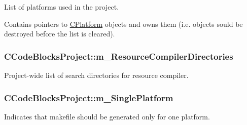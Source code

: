List of platforms used in the project. 

Contains pointers to \hyperlink{classCPlatform}{C\-Platform} objects and owns them (i.\-e. objects sould be destroyed before the list is cleared). \hypertarget{classCCodeBlocksProject_aebc2c851c4ee0779cbeefff19a723b07}{
\subsubsection[{m\-\_\-\-Resource\-Compiler\-Directories}]{\setlength{\rightskip}{0pt plus 5cm}C\-Code\-Blocks\-Project\-::m\-\_\-\-Resource\-Compiler\-Directories\hspace{0.3cm}{\ttfamily [private]}}}\label{classCCodeBlocksProject_aebc2c851c4ee0779cbeefff19a723b07}


Project-\/wide list of search directories for resource compiler. 

\hypertarget{classCCodeBlocksProject_ae22325c0669ffa1e9a6c3db15135a7b1}{
\subsubsection[{m\-\_\-\-Single\-Platform}]{\setlength{\rightskip}{0pt plus 5cm}C\-Code\-Blocks\-Project\-::m\-\_\-\-Single\-Platform\hspace{0.3cm}{\ttfamily [private]}}}\label{classCCodeBlocksProject_ae22325c0669ffa1e9a6c3db15135a7b1}


Indicates that makefile should be generated only for one platform. 

